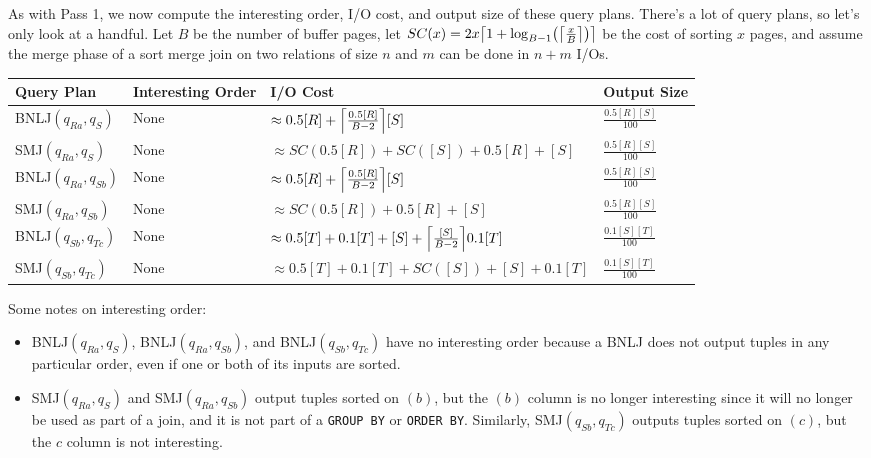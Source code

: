 \documentclass{article}
\begin{document}
As with Pass 1, we now compute the interesting order, I/O cost, and output size
of these query plans. There's a lot of query plans, so let's only look at a
handful. Let $B$ be the number of buffer pages, let $SC(x) = \sortcost{x}$ be
the cost of sorting $x$ pages, and assume the merge phase of a sort merge join
on two relations of size $n$ and $m$ can be done in $n + m$ I/Os.

\begin{center}
  \renewcommand{\arraystretch}{2}
  \begin{tabular}{|l|l|l|l|}
    \hline
    Query Plan             & Interesting Order & I/O Cost                                               & Output Size \\\hline\hline
    BNLJ$(q_{Ra}, q_{S})$  & None              & $\approx \bnlj{0.5[R]}{[S]}$                           & $\frac{0.5[R][S]}{100}$ \\\hline
    SMJ$(q_{Ra}, q_{S})$   & None              & $\approx SC(0.5[R]) + SC([S]) + 0.5[R] + [S]$          & $\frac{0.5[R][S]}{100}$ \\\hline
    BNLJ$(q_{Ra}, q_{Sb})$ & None              & $\approx \bnlj{0.5[R]}{[S]}$                           & $\frac{0.5[R][S]}{100}$ \\\hline
    SMJ$(q_{Ra}, q_{Sb})$  & None              & $\approx SC(0.5[R]) + 0.5[R] + [S]$                    & $\frac{0.5[R][S]}{100}$ \\\hline
    BNLJ$(q_{Sb}, q_{Tc})$ & None              & $\approx 0.5[T] + 0.1[T] + \bnlj{[S]}{0.1[T]}$     & $\frac{0.1[S][T]}{100}$ \\\hline
    SMJ$(q_{Sb}, q_{Tc})$  & None              & $\approx 0.5[T] + 0.1[T] + SC([S]) + [S] + 0.1[T]$ & $\frac{0.1[S][T]}{100}$ \\\hline
  \end{tabular}
\end{center}

Some notes on interesting order:
\begin{itemize}
  \item
    BNLJ$(q_{Ra}, q_{S})$,  BNLJ$(q_{Ra}, q_{Sb})$, and BNLJ$(q_{Sb}, q_{Tc})$
    have no interesting order because a BNLJ does not output tuples in any
    particular order, even if one or both of its inputs are sorted.

  \item
    SMJ$(q_{Ra}, q_{S})$ and SMJ$(q_{Ra}, q_{Sb})$ output tuples sorted on
    $(b)$, but the $(b)$ column is no longer interesting since it will no
    longer be used as part of a join, and it is not part of a \texttt{GROUP BY}
    or \texttt{ORDER BY}. Similarly, SMJ$(q_{Sb}, q_{Tc})$ outputs tuples
    sorted on $(c)$, but the $c$ column is not interesting.
\end{itemize}
\end{document}

